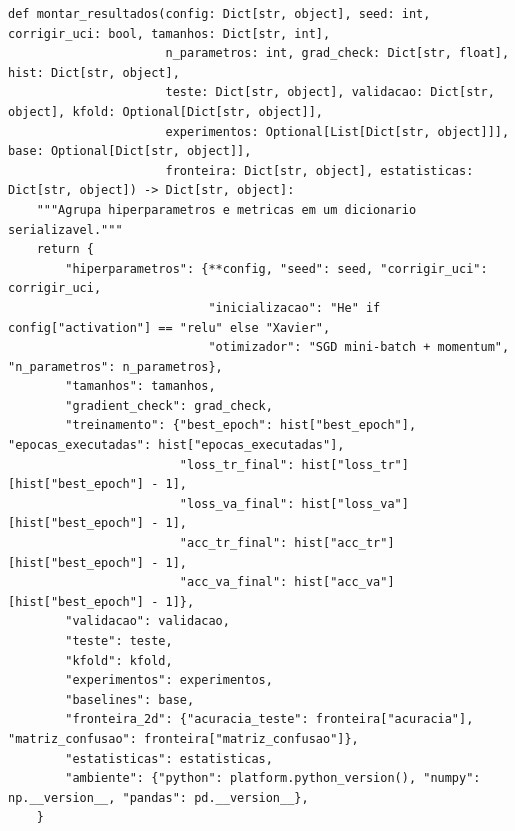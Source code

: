 \documentclass[12pt,a4paper]{article}
\begin{document}
{\begin{lstlisting}[caption={Programa completo \texttt{iris\_mlp.py}.},label={lst:iris_mlp}]
def montar_resultados(config: Dict[str, object], seed: int, corrigir_uci: bool, tamanhos: Dict[str, int],
                      n_parametros: int, grad_check: Dict[str, float], hist: Dict[str, object],
                      teste: Dict[str, object], validacao: Dict[str, object], kfold: Optional[Dict[str, object]],
                      experimentos: Optional[List[Dict[str, object]]], base: Optional[Dict[str, object]],
                      fronteira: Dict[str, object], estatisticas: Dict[str, object]) -> Dict[str, object]:
    """Agrupa hiperparametros e metricas em um dicionario serializavel."""
    return {
        "hiperparametros": {**config, "seed": seed, "corrigir_uci": corrigir_uci,
                            "inicializacao": "He" if config["activation"] == "relu" else "Xavier",
                            "otimizador": "SGD mini-batch + momentum", "n_parametros": n_parametros},
        "tamanhos": tamanhos,
        "gradient_check": grad_check,
        "treinamento": {"best_epoch": hist["best_epoch"], "epocas_executadas": hist["epocas_executadas"],
                        "loss_tr_final": hist["loss_tr"][hist["best_epoch"] - 1],
                        "loss_va_final": hist["loss_va"][hist["best_epoch"] - 1],
                        "acc_tr_final": hist["acc_tr"][hist["best_epoch"] - 1],
                        "acc_va_final": hist["acc_va"][hist["best_epoch"] - 1]},
        "validacao": validacao,
        "teste": teste,
        "kfold": kfold,
        "experimentos": experimentos,
        "baselines": base,
        "fronteira_2d": {"acuracia_teste": fronteira["acuracia"], "matriz_confusao": fronteira["matriz_confusao"]},
        "estatisticas": estatisticas,
        "ambiente": {"python": platform.python_version(), "numpy": np.__version__, "pandas": pd.__version__},
    }



\end{lstlisting}}
\end{document}
